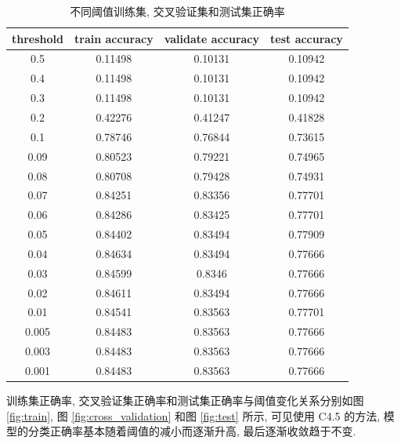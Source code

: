\documentclass{article}
\begin{document}
\begin{table}[htbp]
  \centering
  \caption{不同阈值训练集, 交叉验证集和测试集正确率}
  \label{tab:train_validate_acc}
  \begin{tabular}{cccc}
    \toprule
    threshold & train accuracy & validate accuracy & test accuracy \\
    \midrule
    0.5       & 0.11498        & 0.10131           & 0.10942      \\
    0.4       & 0.11498        & 0.10131           & 0.10942      \\
    0.3       & 0.11498        & 0.10131           & 0.10942      \\
    0.2       & 0.42276        & 0.41247           & 0.41828      \\
    0.1       & 0.78746        & 0.76844           & 0.73615      \\
    0.09      & 0.80523        & 0.79221           & 0.74965      \\
    0.08      & 0.80708        & 0.79428           & 0.74931      \\
    0.07      & 0.84251        & 0.83356           & 0.77701      \\
    0.06      & 0.84286        & 0.83425           & 0.77701      \\
    0.05      & 0.84402        & 0.83494           & 0.77909      \\
    0.04      & 0.84634        & 0.83494           & 0.77666      \\
    0.03      & 0.84599        & 0.8346            & 0.77666      \\
    0.02      & 0.84611        & 0.83494           & 0.77666      \\
    0.01      & 0.84541        & 0.83563           & 0.77701      \\
    0.005     & 0.84483        & 0.83563           & 0.77666      \\
    0.003     & 0.84483        & 0.83563           & 0.77666      \\
    0.001     & 0.84483        & 0.83563           & 0.77666 \\
    \bottomrule       
  \end{tabular}
\end{table}

训练集正确率, 交叉验证集正确率和测试集正确率与阈值变化关系分别如图 \ref{fig:train}, 图 \ref{fig:cross_validation} 和图 \ref{fig:test} 所示, 可见使用 C4.5 的方法, 模型的分类正确率基本随着阈值的减小而逐渐升高, 最后逐渐收敛趋于不变.
\end{document}
